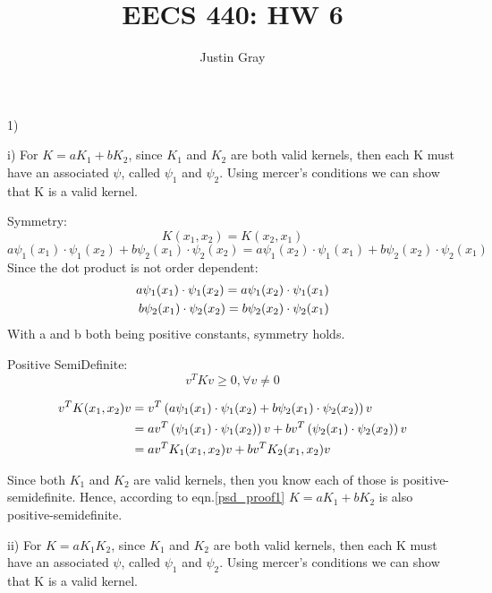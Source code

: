\documentclass[12pt]{article}
\title{EECS 440: HW 6}
\author{Justin Gray}
\begin{document}
\maketitle
\setcounter{equation}{0}
1) 

i) For $K = aK_1 + bK_2$, since $K_1$ and $K_2$ are both valid kernels, then each K must 
have an associated $\psi$, called $\psi_1$ and $\psi_2$. Using mercer's conditions 
we can show that K is a valid kernel. 

Symmetry: 
\begin{equation}
    K(x_1,x_2) = K(x_2,x_1)
\end{equation}
\begin{equation}
    a\psi_1(x_1)\cdot\psi_1(x_2) + b\psi_2(x_1)\cdot\psi_2(x_2) = a\psi_1(x_2)\cdot\psi_1(x_1) + b\psi_2(x_2)\cdot\psi_2(x_1)
\end{equation}
Since the dot product is not order dependent: 
\begin{align}
    a\psi_1(x_1)\cdot\psi_1(x_2) = a\psi_1(x_2)\cdot\psi_1(x_1) \notag \\
    b\psi_2(x_1)\cdot\psi_2(x_2) = b\psi_2(x_2)\cdot\psi_2(x_1)
\end{align}
With a and b both being positive constants, symmetry holds. 

Positive SemiDefinite: 
\begin{equation}
    v^T K v \geq 0, \forall v\neq 0
\end{equation}

\begin{align}
    v^T K(x_1,x_2) v &= v^T \left( a\psi_1(x_1)\cdot\psi_1(x_2) + b\psi_2(x_1)\cdot\psi_2(x_2) \right) v \notag \\
    &= av^T \left( \psi_1(x_1)\cdot \psi_1(x_2) \right) v +  bv^T \left(\psi_2(x_1)\cdot\psi_2(x_2) \right) v \notag \\
    &= av^T K_1(x_1,x_2)v +  bv^T K_2(x_1,x_2)v 
    \label{psd_proof1}
\end{align}

Since both $K_1$ and $K_2$ are valid kernels, then you know each of those is 
positive-semidefinite. Hence, according to eqn.\ref{psd_proof1} $K = aK_1 + bK_2$
is also positive-semidefinite.

ii) For $K = aK_1K_2$, since $K_1$ and $K_2$ are both valid kernels, then each K must 
have an associated $\psi$, called $\psi_1$ and $\psi_2$. Using mercer's conditions 
we can show that K is a valid kernel. 
\end{document}
